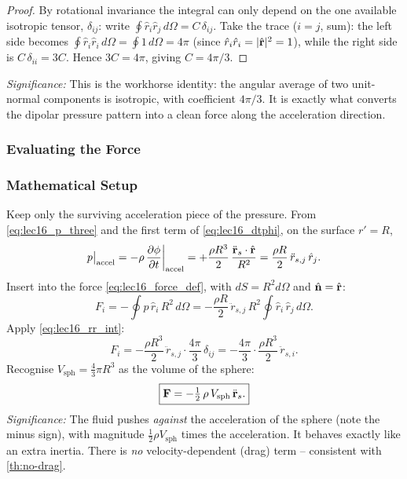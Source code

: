 \documentclass[../main.tex]{subfiles}
\begin{document}
\begin{proof}
By rotational invariance the integral can only depend on the one available isotropic tensor, $\delta_{ij}$: write $\oint \hat r_i\hat r_j\,d\Omega = C\,\delta_{ij}$. Take the trace ($i=j$, sum): the left side becomes $\oint \hat r_i\hat r_i\,d\Omega = \oint 1\,d\Omega = 4\pi$ (since $\hat r_i\hat r_i=|\hat{\mathbf{r}}|^2=1$), while the right side is $C\,\delta_{ii}=3C$. Hence $3C=4\pi$, giving $C=4\pi/3$.
\end{proof}
\textit{Significance:} This is the workhorse identity: the angular average of two unit-normal components is isotropic, with coefficient $4\pi/3$. It is exactly what converts the dipolar pressure pattern into a clean force along the acceleration direction.

\subsubsection{Evaluating the Force}

\subsubsection*{Mathematical Setup}
Keep only the surviving acceleration piece of the pressure. From \eqref{eq:lec16_p_three} and the first term of \eqref{eq:lec16_dtphi}, on the surface $r'=R$,
\begin{equation}
  p\big|_{\text{accel}} = -\rho\,\pdv{\phi}{t}\bigg|_{\text{accel}} = +\frac{\rho R^3}{2}\,\frac{\ddot{\mathbf{r}}_s\cdot\hat{\mathbf{r}}}{R^2}
  = \frac{\rho R}{2}\,\ddot r_{s,j}\,\hat r_j.
  \label{eq:lec16_p_accel}
\end{equation}
Insert into the force \eqref{eq:lec16_force_def}, with $dS=R^2 d\Omega$ and $\hat{\mathbf{n}}=\hat{\mathbf{r}}$:
\begin{equation}
  F_i = -\oint p\,\hat r_i\,R^2\,d\Omega
  = -\frac{\rho R}{2}\,\ddot r_{s,j}\,R^2\oint \hat r_i\,\hat r_j\,d\Omega.
  \label{eq:lec16_F_setup}
\end{equation}
Apply \eqref{eq:lec16_rr_int}:
\begin{equation}
  F_i = -\frac{\rho R^3}{2}\,\ddot r_{s,j}\cdot\frac{4\pi}{3}\,\delta_{ij}
  = -\frac{4\pi}{3}\cdot\frac{\rho R^3}{2}\,\ddot r_{s,i}.
  \label{eq:lec16_F_eval}
\end{equation}
Recognise $V_{\text{sph}}=\tfrac{4}{3}\pi R^3$ as the volume of the sphere:
\begin{equation}
  \boxed{\mathbf{F} = -\tfrac{1}{2}\,\rho\,V_{\text{sph}}\,\ddot{\mathbf{r}}_s.}
  \label{eq:lec16_force_addedmass}
\end{equation}
\textit{Significance:} The fluid pushes \emph{against} the acceleration of the sphere (note the minus sign), with magnitude $\tfrac{1}{2}\rho V_{\text{sph}}$ times the acceleration. It behaves exactly like an extra inertia. There is \emph{no} velocity-dependent (drag) term -- consistent with \cref{th:no-drag}.
\end{document}
